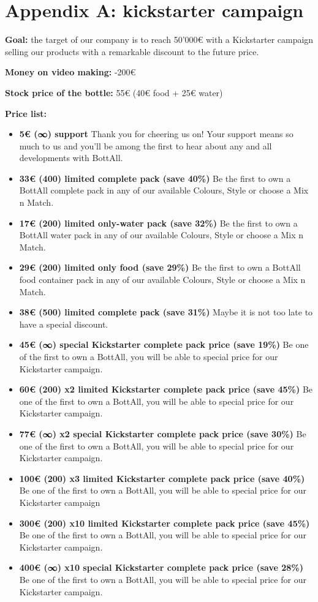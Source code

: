 \section*{Appendix A: kickstarter campaign}
\textbf{Goal:} the target of our company is to reach 50’000€ with a Kickstarter campaign selling our products with a remarkable discount to the future price. 

\textbf{Money on video making:} -200€ 

\textbf{Stock price of the bottle:} 55€ (40€ food + 25€ water) 

\textbf{Price list:}
\begin{itemize}
    \item \textbf{5€ (∞) support}
    Thank you for cheering us on! Your support means so much to us and you'll be among the first to hear about any and all developments with BottAll.
    \item \textbf{33€ (400) limited complete pack (save 40\%)}
    Be the first to own a BottAll complete pack in any of our available Colours, Style or choose a Mix n Match. 

    \item \textbf{17€ (200) limited only-water pack (save 32\%) }
    Be the first to own a BottAll water pack in any of our available Colours, Style or choose a Mix n Match. 
    \item \textbf{29€ (200) limited only food (save 29\%) }
    Be the first to own a BottAll food container pack in any of our available Colours, Style or choose a Mix n Match. 
    \item \textbf{38€ (500) limited complete pack (save 31\%)}
    Maybe it is not too late to have a special discount. 
    \item \textbf{45€ (∞) special Kickstarter complete pack price (save 19\%) }
    Be one of the first to own a BottAll, you will be able to special price for our Kickstarter campaign. 
    \item \textbf{60€ (200) x2 limited Kickstarter complete pack price (save 45\%)} 
    Be one of the first to own a BottAll, you will be able to special price for our Kickstarter campaign. 
    \item \textbf{77€ (∞) x2 special Kickstarter complete pack price (save 30\%)}
    Be one of the first to own a BottAll, you will be able to special price for our Kickstarter campaign. 
    \item \textbf{100€ (200) x3 limited Kickstarter complete pack price (save 40\%)}
    Be one of the first to own a BottAll, you will be able to special price for our Kickstarter campaign 
    \item \textbf{300€ (200) x10 limited Kickstarter complete pack price (save 45\%)}
    Be one of the first to own a BottAll, you will be able to special price for our Kickstarter campaign. 
    \item \textbf{400€ (∞) x10 special Kickstarter complete pack price (save 28\%)} 
    Be one of the first to own a BottAll, you will be able to special price for our Kickstarter campaign. 
\end{itemize}



